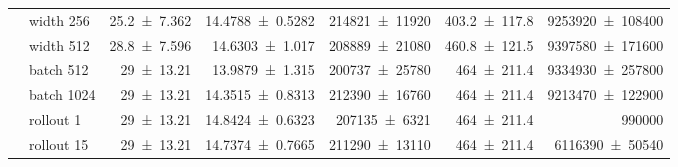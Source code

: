\begin{table}[tbp]
{\begin{tabular}{@{}llrrrrr@{}}
         & width 256 & \num{25.2+-7.362} & \num{14.4788+-0.5282} & \num{214821+-11920} & \num{403.2+-117.8} & \num{9253920+-108400} \\
         & width 512 & \num{28.8+-7.596} & \num{14.6303+-1.017} & \num{208889+-21080} & \num{460.8+-121.5} & \num{9397580+-171600} \\
         & batch 512 & \num{29+-13.21} & \num{13.9879+-1.315} & \num{200737+-25780} & \num{464+-211.4} & \num{9334930+-257800} \\
         & batch 1024 & \num{29+-13.21} & \num{14.3515+-0.8313} & \num{212390+-16760} & \num{464+-211.4} & \num{9213470+-122900} \\
         & rollout 1 & \num{29+-13.21} & \num{14.8424+-0.6323} & \num{207135+-6321} & \num{464+-211.4} & \num{990000} \\
         & rollout 15 & \num{29+-13.21} & \num{14.7374+-0.7665} & \num{211290+-13110} & \num{464+-211.4} & \num{6116390+-50540} \\
      \bottomrule
    \end{tabular}}
\end{table}

